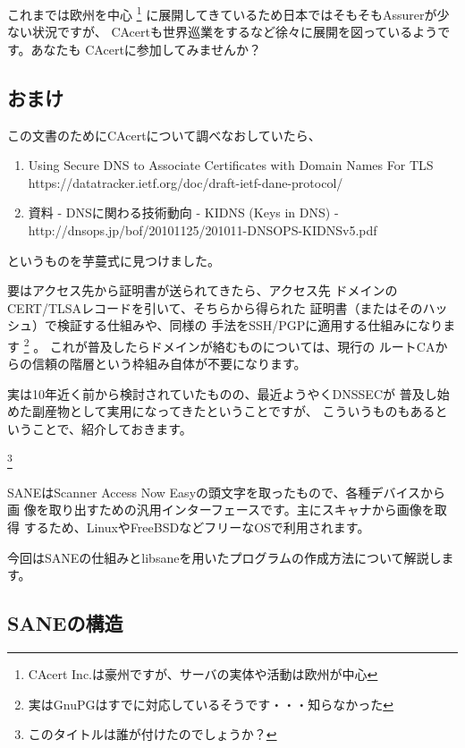 \documentclass[mingoth,a4paper]{jsarticle}
\begin{document}
これまでは欧州を中心
\footnote{CAcert Inc.は豪州ですが、サーバの実体や活動は欧州が中心}
に展開してきているため日本ではそもそもAssurerが少ない状況ですが、
CAcertも世界巡業をするなど徐々に展開を図っているようです。あなたも
CAcertに参加してみませんか？

\subsection{おまけ}
この文書のためにCAcertについて調べなおしていたら、
\begin{enumerate}
\item
Using Secure DNS to Associate Certificates with Domain Names For TLS\\
https://datatracker.ietf.org/doc/draft-ietf-dane-protocol/
\item
資料 - DNSに関わる技術動向 - KIDNS (Keys in DNS) -\\
http://dnsops.jp/bof/20101125/201011-DNSOPS-KIDNSv5.pdf
\end{enumerate}
というものを芋蔓式に見つけました。

要はアクセス先から証明書が送られてきたら、アクセス先
ドメインのCERT/TLSAレコードを引いて、そちらから得られた
証明書（またはそのハッシュ）で検証する仕組みや、同様の
手法をSSH/PGPに適用する仕組みになります
\footnote{実はGnuPGはすでに対応しているそうです・・・知らなかった}
。
これが普及したらドメインが絡むものについては、現行の
ルートCAからの信頼の階層という枠組み自体が不要になります。

実は10年近く前から検討されていたものの、最近ようやくDNSSECが
普及し始めた副産物として実用になってきたということですが、
こういうものもあるということで、紹介しておきます。

\footnote{このタイトルは誰が付けたのでしょうか？}


SANEはScanner Access Now Easyの頭文字を取ったもので、各種デバイスから画
像を取り出すための汎用インターフェースです。主にスキャナから画像を取得
するため、LinuxやFreeBSDなどフリーなOSで利用されます。

今回はSANEの仕組みとlibsaneを用いたプログラムの作成方法について解説します。

\subsection{SANEの構造}
\end{document}
